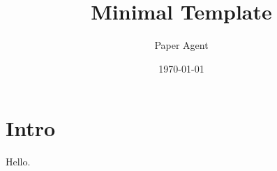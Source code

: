 \documentclass{article}
\title{Minimal Template}
\author{Paper Agent}
\date{\today}
\begin{document}
\maketitle
\section{Intro}
Hello.
\end{document}
